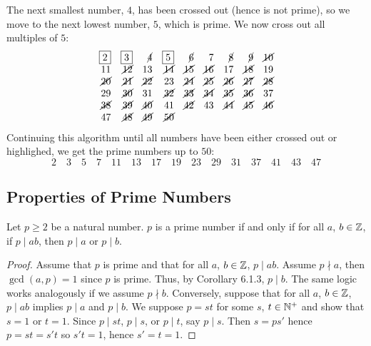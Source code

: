 The next smallest number, $4$, has been crossed out (hence is not prime), so we move to the next lowest number, $5$, which is prime. We now cross out all multiples of $5$:
\[
\begin{array}{rrrrrrrrr}
\boxed{2} & \boxed{3} & \cancel{4} & \boxed{5} & \cancel{6} & 7 &
\cancel{8} & \cancel{9} & \cancel{10} \\
11 & \cancel{12} & 13 & \cancel{14} & \cancel{15} & \cancel{16} &
17 & \cancel{18} & 19 \\
\cancel{20} & \cancel{21} & \cancel{22} & 23 & \cancel{24} &
\cancel{25} & \cancel{26} & \cancel{27} & \cancel{28} \\
29 & \cancel{30} & 31 & \cancel{32} & \cancel{33} & \cancel{34} &
\cancel{35} & \cancel{36} & 37 \\
\cancel{38} & \cancel{39} & \cancel{40} & 41 & \cancel{42} &
43 & \cancel{44} & \cancel{45} & \cancel{46} \\
47 & \cancel{48} & \cancel{49} & \cancel{50}
\end{array}
\]
Continuing this algorithm until all numbers have been either crossed out or highlighed, we get the prime numbers up to $50$:
\[
\boxed{2}\quad \boxed{3}\quad \boxed{5}\quad \boxed{7}\quad
\boxed{11}\quad \boxed{13}\quad \boxed{17}\quad \boxed{19}\quad
\boxed{23}\quad \boxed{29}\quad \boxed{31}\quad \boxed{37}\quad
\boxed{41}\quad \boxed{43}\quad \boxed{47}
\]

\subsection{Properties of Prime Numbers}

\begin{thmbox}
   Let $p \geq 2$ be a natural number. $p$ is a prime number if and only if for all $a$, $b \in \mathbb{Z}$, if $p \mid ab$, then $p \mid a$ or $p \mid b$. 
\end{thmbox}
\begin{proof}
   Assume that $p$ is prime and that for all $a$, $b \in \mathbb{Z}$, $p \mid ab$. Assume $p \nmid a$, then $\gcd(a,p) = 1$ since $p$ is prime. Thus, by Corollary 6.1.3, $p \mid b$. The same logic works analogously if we assume $p \nmid b$. Conversely, suppose that for all $a$, $b \in \mathbb{Z}$, $p \mid ab$ implies $p \mid a$ and $p \mid b$. We suppose $p = st$ for some $s$, $t \in \mathbb{N}^+$ and show that $s = 1$ or $t = 1$. Since $p \mid st$, $p \mid s$, or $p \mid t$, say $p \mid s$. Then $s = ps'$ hence $p = st = s't$ so $s't = 1$, hence $s' = t = 1$. 
\end{proof}

